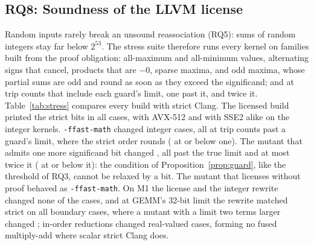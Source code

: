 \documentclass[acmsmall,review,anonymous,nonacm]{acmart}
\begin{document}
\subsection{RQ8: Soundness of the LLVM license}\label{sec:rq8}
\begin{table}[t]
\caption{RQ8 on M2. Stress cases whose output differs from strict Clang's, per
build: \LlvmStressCases{} cases over \LlvmStressKernels{} kernels,
\LlvmStressFamilies{} input families and trip counts up to twice each guard's
limit, split into integer kernels and the real-valued control. Strict builds
disagree with each other on the control because Clang contracts $s+ab$ into a
fused multiply-add where the target has one (its default
\texttt{-ffp-contract=on}).}
\label{tab:stress}\centering\footnotesize
\end{table}
Random inputs rarely break an unsound reassociation (RQ5): sums of random
integers stay far below $2^{53}$. The stress suite therefore runs every kernel
on families built from the proof obligation: all-maximum and all-minimum values,
alternating signs that cancel, products that are $-0$, sparse maxima, and odd
maxima, whose partial sums are odd and round as soon as they exceed the
significand; and at trip counts that include each guard's limit, one past it,
and twice it. Table~\ref{tab:stress} compares every build with strict Clang.
The licensed build printed the strict bits in all \LlvmStressCases{} cases,
with AVX-512 and with SSE2 alike on the integer kernels. \texttt{-ffast-math}
changed \LlvmStressFastMathInt{} integer cases, all at trip counts past a
guard's limit, where the strict order rounds (\LlvmStressFastMathWithin{} at
or below one). The mutant that admits one more significand bit changed
\LlvmStressMutantBitInt{}, all past the true limit and at most twice it
(\LlvmStressMutantBitWithin{} at or below it): the condition of
Proposition~\ref{prop:guard}, like the threshold of RQ3, cannot be relaxed by a
bit. The mutant that licenses without proof behaved as \texttt{-ffast-math}.
On M1 the license and the integer rewrite changed none of the cases, and at
GEMM's 32-bit limit the rewrite matched strict on all \BaseTierCases{} boundary
cases, where a mutant with a limit two terms larger changed
\BaseTierMutantChanged; in-order reductions changed
\BaseStressOrderedRealChanged{} real-valued cases, forming no fused
multiply-add where scalar strict Clang does.
\end{document}
